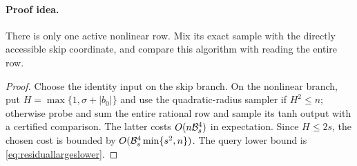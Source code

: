 \paragraph{Proof idea.}
There is only one active nonlinear row. Mix its exact sample with the
directly accessible skip coordinate, and compare this algorithm with reading
the entire row.

\begin{proof}
Choose the identity input on the skip branch. On the nonlinear
branch, put $H=\max\{1,\sigma+|b_0|\}$ and use the
quadratic-radius sampler if $H^2\le n$; otherwise probe and
sum the entire rational row and sample
its tanh output with a certified comparison. The latter costs
$O(n\mathcal B_s^4)$ in expectation. Since $H\le2s$, the chosen
cost is bounded by $O(\mathcal B_s^4\min\{s^2,n\})$.
The query lower bound is
\eqref{eq:residuallargeslower}.
\end{proof}
